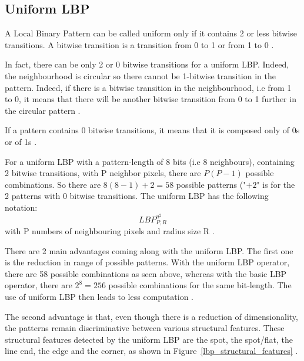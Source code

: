 \subsection{Uniform LBP}

\vspace{\baselineskip}
\noindent A Local Binary Pattern can be called uniform only if it contains 2 or less bitwise transitions. A bitwise transition is a transition from 0 to 1 or from 1 to 0 \cite{GAN08}. 
\newline

\noindent In fact, there can be only 2 or 0 bitwise transitions for a uniform LBP. Indeed, the neighbourhood is circular so there cannot be 1-bitwise transition in the pattern. Indeed, if there is a bitwise transition in the neighbourhood, i.e from 1 to 0, it means that there will be another bitwise transition from 0 to 1 further in the circular pattern \cite{GAN08}.
\newline

\noindent If a pattern contains 0 bitwise transitions, it means that it is composed only of 0s or of 1s \cite{GAN08}.
\newline

\noindent For a uniform LBP with a pattern-length of 8 bits (i.e 8 neighbours), containing 2 bitwise transitions, with P neighbor pixels, there are $ P(P - 1) $ possible combinations. So there are $ 8(8 - 1) + 2 =58 $ possible patterns ("$ + 2 $" is for the 2 patterns with 0 bitwise transitions. The uniform LBP has the following notation: \[ LBP_{P,R}^{u^2} \] with P numbers of neighbouring pixels and radius size R \cite{GAN08}.
\newline

\noindent There are 2 main advantages coming along with the uniform LBP. The first one is the reduction in range of possible patterns. With the uniform LBP operator, there are 58 possible combinations as seen above, whereas with the basic LBP operator, there are $ 2^8 = 256 $ possible combinations for the same bit-length. The use of uniform LBP then leads to less computation \cite{GAN08}.
\newline

\noindent The second advantage is that, even though there is a reduction of dimensionality, the patterns remain discriminative between various structural features. These structural features detected by the uniform LBP are the spot, the spot/flat, the line end, the edge and the corner, as shown in Figure~\ref{lbp_structural_features}  \cite{GAN08}.
\newline


